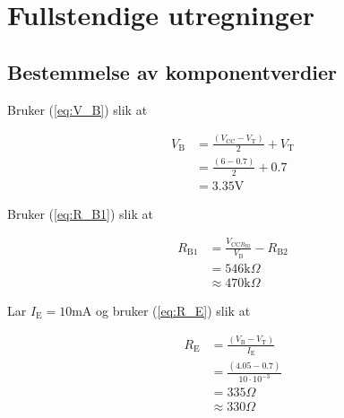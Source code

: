 \appendix
\section{Fullstendige utregninger}\label{ax:math}

\subsection{Bestemmelse av komponentverdier}

Bruker (\ref{eq:V_B}) slik at

\begin{equation}
    \begin{split}
         V_\text{B} &= \frac{(V_{\text{CC}}-V_\text{T})}{2}+V_\text{T} \\
         &= \frac{(6-0.7)}{2}+0.7 \\
         &= 3.35\text{V}
    \end{split}
\end{equation}

Bruker (\ref{eq:R_B1}) slik at

\begin{equation}
    \begin{split}
        R_{\text{B}1} &= \frac{V_{\text{CC}R_{\text{B}2}}}{V_\text{B}}-R_{\text{B}2} \\
        &= 546\text{k}\Omega \\
        &\approx 470\text{k}\Omega
    \end{split}
\end{equation}

Lar $I_\text{E}=10\text{mA}$ og bruker (\ref{eq:R_E}) slik at

\begin{equation}
    \begin{split}
        R_\text{E} &= \frac{(V_\text{B}-V_\text{T})}{I_\text{E}} \\
        &= \frac{(4.05-0.7)}{10\cdot10^{-3}} \\
        &= 335\Omega \\
        &\approx 330\Omega
    \end{split}
\end{equation}